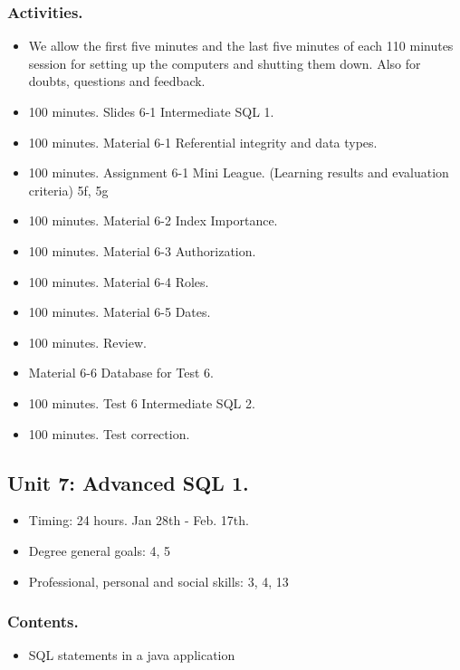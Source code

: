 \documentclass[catalan, a4paper, 12pt, titlepage]{article}
\begin{document}
  \subsubsection{Activities.}
  \begin{itemize}
          \item We allow the first five minutes and the last five minutes of each 110 minutes session for setting up the computers and shutting them down. Also for doubts, questions and feedback.
	  \item 100 minutes. Slides 6-1 Intermediate SQL 1.
	  \item 100 minutes. Material 6-1 Referential integrity and data types.
	  \item 100 minutes. Assignment 6-1 Mini League. (\faGraduationCap Learning results and evaluation criteria) 5f, 5g
	  \item 100 minutes. Material 6-2 Index Importance.
	  \item 100 minutes. Material 6-3 Authorization.
	  \item 100 minutes. Material 6-4 Roles.
	  \item 100 minutes. Material 6-5 Dates.
	  \item 100 minutes. Review.
	  \item Material 6-6 Database for Test 6.
	  \item 100 minutes. Test 6 Intermediate SQL 2.
	  \item 100 minutes. Test correction.
  \end{itemize}
  

  \subsection{Unit 7: Advanced SQL 1.}

  \begin{itemize}
	\item Timing: 24 hours. Jan 28th - Feb. 17th.
	\item Degree general goals: 4, 5
	\item Professional, personal and social skills: 3, 4, 13
  \end{itemize}
  
  \subsubsection{Contents.}
  \begin{itemize}
	  \item SQL statements in a java application
  \end{itemize}
\end{document}
